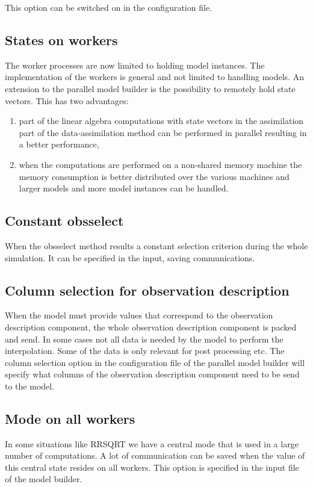 This option can be switched on in the configuration file.

\subsection{States on workers}
The worker processes are now limited to holding model instances. The
implementation of the workers is general and not limited to handling
models. An extension to the parallel model builder is the possibility to
remotely hold state vectors.  This has two advantages:
\begin{enumerate}
\item part of the linear algebra computations with state vectors in the
assimilation part of the data-assimilation method can be performed
in parallel resulting in a better performance,
\item when the computations are performed on a non-shared memory machine
the memory consumption is better distributed over the various machines and
larger models and more model instances can be handled. 
\end{enumerate}

\subsection{Constant obsselect}
When the obsselect method results a constant selection criterion during the
whole simulation. It can be specified in the input, saving communications.


\subsection{Column selection for observation description}
When the model must provide values that correspond to the observation
description component, the whole observation description component is
packed and send. In some cases not all data is needed by the model to
perform the interpolation. Some of the data is only relevant for post
processing etc. The column selection option in the configuration file of
the parallel model builder will specify what columns of the observation
description component need to be send to the model.

\subsection{Mode on all workers}
In some situations like RRSQRT we have a central mode that is used in a
large number of computations. A lot of communication can be saved when the
value of this central state resides on all workers. This option is
specified in the input file of the model builder.

